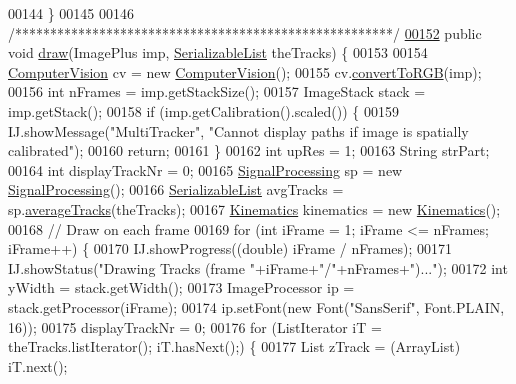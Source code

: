 \begin{DoxyCode}
00144   \}
00145 
00146   \textcolor{comment}{/******************************************************/}
\hypertarget{_paint_8java_source_l00152}{}\hyperlink{classfunctions_1_1_paint_a86f95f4ee27f7ce9ab517f4e322c9612}{00152}   \textcolor{keyword}{public} \textcolor{keywordtype}{void} \hyperlink{classfunctions_1_1_paint_a86f95f4ee27f7ce9ab517f4e322c9612}{draw}(ImagePlus imp, \hyperlink{classdata_1_1_serializable_list}{SerializableList} theTracks) \{
00153 
00154     \hyperlink{classfunctions_1_1_computer_vision}{ComputerVision} cv = \textcolor{keyword}{new} \hyperlink{classfunctions_1_1_computer_vision}{ComputerVision}();
00155     cv.\hyperlink{classfunctions_1_1_computer_vision_a98a9ec9a4b8c6a28678d649822a73bc8}{convertToRGB}(imp);
00156     \textcolor{keywordtype}{int} nFrames = imp.getStackSize();
00157     ImageStack stack = imp.getStack();
00158     \textcolor{keywordflow}{if} (imp.getCalibration().scaled()) \{
00159       IJ.showMessage(\textcolor{stringliteral}{"MultiTracker"}, \textcolor{stringliteral}{"Cannot display paths if image is spatially calibrated"});
00160       \textcolor{keywordflow}{return};
00161     \}
00162     \textcolor{keywordtype}{int} upRes = 1;
00163     String strPart;
00164     \textcolor{keywordtype}{int} displayTrackNr = 0;
00165     \hyperlink{classfunctions_1_1_signal_processing}{SignalProcessing} sp = \textcolor{keyword}{new} \hyperlink{classfunctions_1_1_signal_processing}{SignalProcessing}();
00166     \hyperlink{classdata_1_1_serializable_list}{SerializableList} avgTracks = sp.\hyperlink{classfunctions_1_1_signal_processing_abf1074d52caa632088bc9c8f12f8ee53}{averageTracks}(theTracks);
00167     \hyperlink{classfunctions_1_1_kinematics}{Kinematics} kinematics = \textcolor{keyword}{new} \hyperlink{classfunctions_1_1_kinematics}{Kinematics}();
00168     \textcolor{comment}{// Draw on each frame}
00169     \textcolor{keywordflow}{for} (\textcolor{keywordtype}{int} iFrame = 1; iFrame <= nFrames; iFrame++) \{
00170       IJ.showProgress((\textcolor{keywordtype}{double}) iFrame / nFrames);
00171       IJ.showStatus(\textcolor{stringliteral}{"Drawing Tracks (frame "}+iFrame+\textcolor{stringliteral}{"/"}+nFrames+\textcolor{stringliteral}{")..."});
00172       \textcolor{keywordtype}{int} yWidth = stack.getWidth();
00173       ImageProcessor ip = stack.getProcessor(iFrame);
00174       ip.setFont(\textcolor{keyword}{new} Font(\textcolor{stringliteral}{"SansSerif"}, Font.PLAIN, 16));
00175       displayTrackNr = 0;
00176       \textcolor{keywordflow}{for} (ListIterator iT = theTracks.listIterator(); iT.hasNext();) \{
00177         List zTrack = (ArrayList) iT.next();

\end{DoxyCode}
